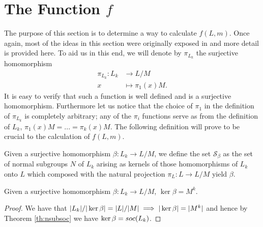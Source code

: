 \chapter{The Function \texorpdfstring{$f$}{f}}

The purpose of this section is to determine a way to calculate $f(L,m)$. Once again, most of the ideas in this section were originally exposed in \cite{DallaVoltaFGNMGAPQ} and more detail is provided here.
To aid us in this end, we will denote by $\pi_{L_k}$ the surjective homomorphism
\begin{align*}
    \pi_{L_k} \colon L_k &\rightarrow L/M \\
                        x &\mapsto \pi_1(x)M.
\end{align*}
It is easy to verify that such a function is well defined and is a surjective homomorphism. Furthermore let us notice that the choice of $\pi_1$ in the definition of $\pi_{L_k}$ is completely arbitrary; any of the $\pi_i$ functions serve as from the definition of $L_k$, 
$\pi_1(x)M = ... = \pi_k(x)M$.
The following definition will prove to be crucial to the calculation of $f(L,m)$.
\begin{definition}
    Given a surjective homomorphism $\beta \colon L_k \rightarrow L/M$, we define the set $\mathscr{S}_\beta$ as the set of normal subgroups $N$ of $L_k$ arising as kernels of those homomorphisms of $L_k$ onto $L$ which composed with the natural projection $\pi_L \colon L \rightarrow L/M$ yield $\beta$.
\end{definition}

\begin{theorem}
    Given a surjective homomorphism $\beta \colon L_k \rightarrow L/M$, $\ker \beta = M^k$.
\end{theorem}

\begin{proof}
    We have that $| L_k |/| \ker \beta | = | L |/| M | \implies | \ker \beta | = | M^k |$ and hence by Theorem \ref{th:nsubsoc} we have $\ker \beta = soc {(L_k)}$.
\end{proof}





